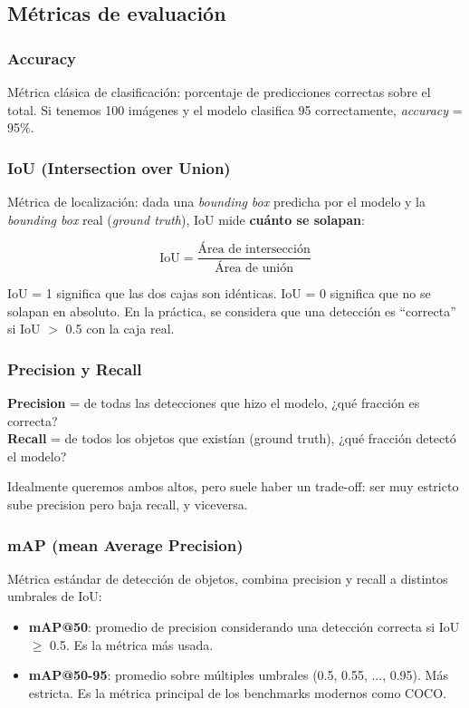 \documentclass[a4paper,11pt]{article}
\begin{document}
\subsection{Métricas de evaluación}

\subsubsection{Accuracy}

Métrica clásica de clasificación: porcentaje de predicciones correctas sobre el total. Si tenemos 100 imágenes y el modelo clasifica 95 correctamente, \textit{accuracy} = 95\%.

\subsubsection{IoU (Intersection over Union)}
\label{sec:iou}

Métrica de localización: dada una \textit{bounding box} predicha por el modelo y la \textit{bounding box} real (\textit{ground truth}), IoU mide \textbf{cuánto se solapan}:

$$ \text{IoU} = \frac{\text{Área de intersección}}{\text{Área de unión}} $$

IoU = 1 significa que las dos cajas son idénticas. IoU = 0 significa que no se solapan en absoluto. En la práctica, se considera que una detección es ``correcta'' si IoU $>$ 0.5 con la caja real.

\subsubsection{Precision y Recall}

\textbf{Precision} = de todas las detecciones que hizo el modelo, ¿qué fracción es correcta?\\
\textbf{Recall} = de todos los objetos que existían (ground truth), ¿qué fracción detectó el modelo?

Idealmente queremos ambos altos, pero suele haber un trade-off: ser muy estricto sube precision pero baja recall, y viceversa.

\subsubsection{mAP (mean Average Precision)}

Métrica estándar de detección de objetos, combina precision y recall a distintos umbrales de IoU:

\begin{itemize}[itemsep=1pt]
    \item \textbf{mAP@50}: promedio de precision considerando una detección correcta si IoU $\geq$ 0.5. Es la métrica más usada.
    \item \textbf{mAP@50-95}: promedio sobre múltiples umbrales (0.5, 0.55, ..., 0.95). Más estricta. Es la métrica principal de los benchmarks modernos como COCO.
\end{itemize}
\end{document}
